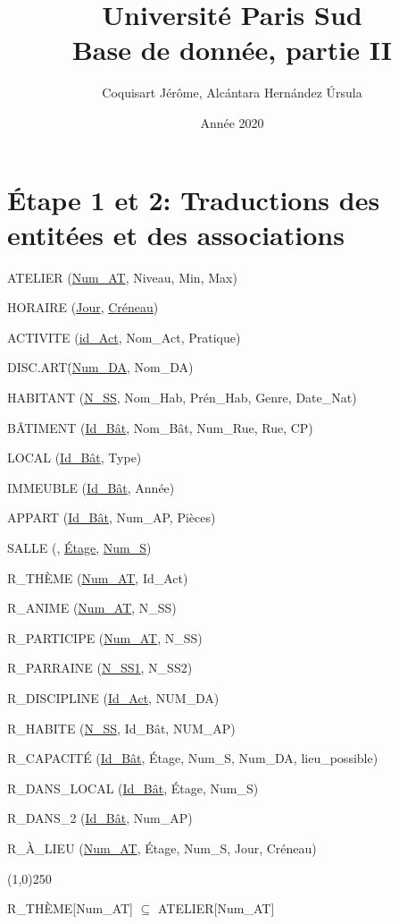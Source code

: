 \documentclass[a4paper,10.5pt]{report}
\title{\textbf{\Huge  Université Paris Sud}\\ Base de donnée, partie II}
\author{Coquisart Jérôme, Alcántara Hernández Úrsula}
\date{Année 2020}
\begin{document}
    \maketitle
    \newpage
    \newpage

    \section*{Étape 1 et 2: Traductions des entitées et des associations}

	ATELIER (\underline{Num\_AT}, Niveau, Min, Max)

	HORAIRE (\underline{Jour}, \underline{Créneau})

	ACTIVITE (\underline{id\_Act}, Nom\_Act, Pratique) 

	DISC.ART\. (\underline{Num\_DA}, Nom\_DA)

	HABITANT (\underline{N\_SS}, Nom\_Hab, Prén\_Hab, Genre, Date\_Nat)

	BÂTIMENT (\underline{Id\_Bât}, Nom\_Bât, Num\_Rue, Rue, CP)

	LOCAL (\underline{Id\_Bât}, Type)

	IMMEUBLE (\underline{Id\_Bât}, Année)

	APPART (\underline{Id\_Bât}, Num\_AP, Pièces)

	SALLE (, \underline{Étage}, \underline{Num\_S})

	R\_THÈME (\underline{Num\_AT}, Id\_Act)

	R\_ANIME (\underline{Num\_AT}, N\_SS)

	R\_PARTICIPE (\underline{Num\_AT}, N\_SS)

	R\_PARRAINE (\underline{N\_SS1}, N\_SS2)

	R\_DISCIPLINE (\underline{Id\_Act}, NUM\_DA)

	R\_HABITE (\underline{N\_SS}, Id\_Bât, NUM\_AP)

	R\_CAPACITÉ (\underline{Id\_Bât}, Étage, Num\_S, Num\_DA, lieu\_possible)

	R\_DANS\_LOCAL (\underline{Id\_Bât}, Étage, Num\_S)

	R\_DANS\_2 (\underline{Id\_Bât}, Num\_AP)

	R\_À\_LIEU (\underline{Num\_AT}, Étage, Num\_S, Jour, Créneau)

	\begin{center}
	\line(1,0){250}
	\end{center}

	R\_THÈME[Num\_AT] $\subseteq$ ATELIER[Num\_AT]
\end{document}
